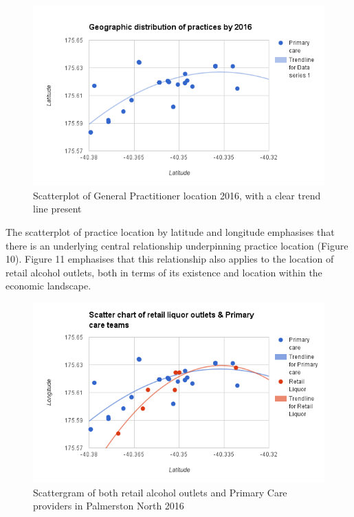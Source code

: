 \documentclass[11pt,a4paper]{article}
\begin{document}
\begin{figure}[htp]
\centering
\includegraphics[scale=0.6]{Nash_GP_2016.png}
\caption{Scatterplot of General Practitioner location 2016, with a clear trend line present}
\label{Scatter plot of General Practitioner locations}
\end{figure}

The scatterplot of practice location by latitude and longitude emphasises that there is an underlying central relationship underpinning practice location (Figure 10). Figure 11 emphasises that this relationship also applies to the location of retail alcohol outlets, both in terms of its existence and location within the economic landscape.\\

\begin{figure}[htp]
\centering
\includegraphics[scale=0.6]{Nash_GP_retail.png}
\caption{ Scattergram of both retail alcohol outlets and Primary Care providers in Palmerston North 2016}
\label{Geographic distribution of practices by 2016, with retail outlets overlaid}
\end{figure}
\end{document}
